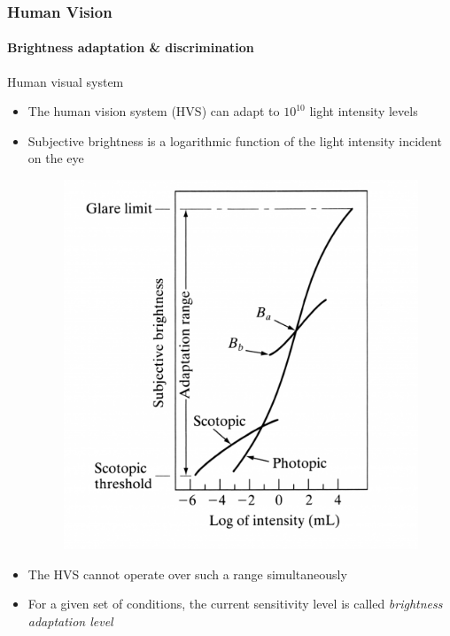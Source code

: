 \documentclass[table]{beamer}
\begin{document}
\begin{frame}
  \frametitle{Human Vision}
  \framesubtitle{Brightness adaptation \& discrimination}
  \begin{block}{Human visual system}
    \begin{itemize}\scriptsize
    \item The human vision system (HVS) can adapt to $10^{10}$ light intensity levels
    \item Subjective brightness is a logarithmic function of the light intensity incident on the eye
      \begin{figure}
        \centering
        \includegraphics[height=.35\textheight]{./images/sb.png}
      \end{figure}
    \item The HVS cannot operate over such a range simultaneously
    \item For a given set of conditions, the current sensitivity level is called \emph{brightness adaptation level}
    \end{itemize}
  \end{block}
\end{frame}
\end{document}
